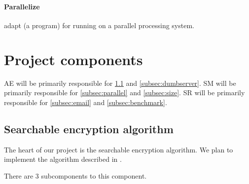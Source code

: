 \documentclass[onecolumn, draftclsnofoot,10pt, compsoc]{IEEEtran}
\begin{document}
\paragraph*{\textbf{Parallelize}} adapt (a program) for running on a parallel processing system.





\section{ Project components }

AE will be primarily responsible for \ref{subsec:sse} and \ref{subsec:dumbserver}.
SM will be primarily responsible for \ref{subsec:parallel} and \ref{subsec:size}.
SR will be primarily responsible for \ref{subsec:email} and \ref{subsec:benchmark}.


\subsection{ Searchable encryption algorithm }
\label{subsec:sse}




The heart of our project is the searchable encryption algorithm. We plan to implement the algorithm described in \cite{cash14}.

There are 3 subcomponents to this component.
\end{document}

